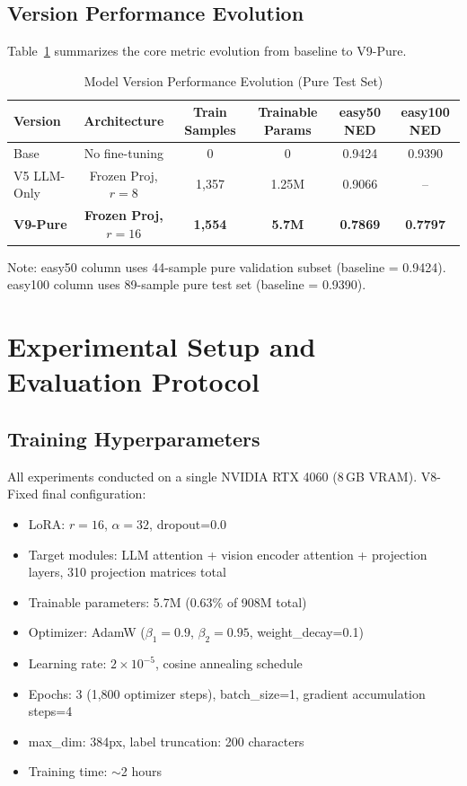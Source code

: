 \subsection{Version Performance Evolution}

Table~\ref{tab:evolution} summarizes the core metric evolution from baseline to V9-Pure.

\begin{table}[h]
\centering
\caption{Model Version Performance Evolution (Pure Test Set)}
\label{tab:evolution}
\begin{tabular}{lccccc}
\toprule
\textbf{Version} & \textbf{Architecture} & \textbf{Train Samples} & \textbf{Trainable Params} & \textbf{easy50 NED} & \textbf{easy100 NED} \\
\midrule
Base       & No fine-tuning  & 0      & 0       & 0.9424 & 0.9390 \\
V5 LLM-Only & Frozen Proj, $r=8$ & 1,357 & 1.25M & 0.9066 & -- \\
\textbf{V9-Pure} & \textbf{Frozen Proj, $r=16$} & \textbf{1,554} & \textbf{5.7M} & \textbf{0.7869} & \textbf{0.7797} \\
\bottomrule
\end{tabular}
\par\smallskip
{\small\noindent Note: easy50 column uses 44-sample pure validation subset (baseline = 0.9424). easy100 column uses 89-sample pure test set (baseline = 0.9390).}
\end{table}


\section{Experimental Setup and Evaluation Protocol}

\subsection{Training Hyperparameters}

All experiments conducted on a single NVIDIA RTX 4060 (8\,GB VRAM). V8-Fixed final configuration:

\begin{itemize}[nosep]
    \item LoRA: $r=16$, $\alpha=32$, dropout=0.0
    \item Target modules: LLM attention + vision encoder attention + projection layers, 310 projection matrices total
    \item Trainable parameters: 5.7M (0.63\% of 908M total)
    \item Optimizer: AdamW ($\beta_1=0.9$, $\beta_2=0.95$, weight\_decay=0.1)
    \item Learning rate: $2\times10^{-5}$, cosine annealing schedule
    \item Epochs: 3 (1,800 optimizer steps), batch\_size=1, gradient accumulation steps=4
    \item max\_dim: 384px, label truncation: 200 characters
    \item Training time: $\sim$2 hours
\end{itemize}

